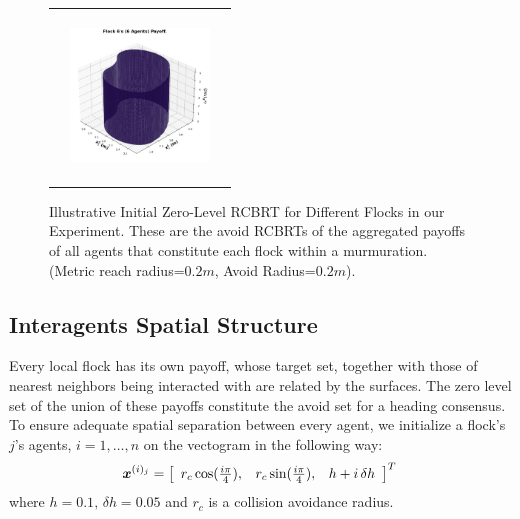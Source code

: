 \begin{figure}[tb!]
\begin{tabular}{ccc}
		&
		\includegraphics[height=12em,width=10em]{figures/flock_6.jpg}
	\end{tabular}
	\caption{\footnotesize Illustrative Initial Zero-Level RCBRT for Different Flocks in our Experiment. These are the avoid RCBRTs of the aggregated payoffs of all  agents that constitute each  flock within a murmuration.  (Metric reach radius=$0.2m$, Avoid Radius=$0.2m$).} 
	\label{fig:flocks_multi}
\end{figure}

\subsection{Interagents Spatial Structure}

Every local flock has its own payoff, whose target set, together with those of nearest neighbors being interacted with are related by the surfaces. The zero level set of the union of these payoffs constitute the avoid set for a heading consensus. To ensure adequate spatial separation between every agent, we initialize a flock's $j$'s agents, $i=1,\ldots, n$ on the vectogram in the following way:
%
\begin{align}
	\state^{(i)_j} = \left[\begin{array}{ccc}
		r_c \cos (\frac{i\pi}{4}), & 	r_c \sin (\frac{i\pi}{4}), & h+i\,\delta h
	\end{array}\right]^T \, %
\end{align}
%
where $h=0.1, \, \delta h = 0.05$ and $r_c$ is a collision avoidance radius.
